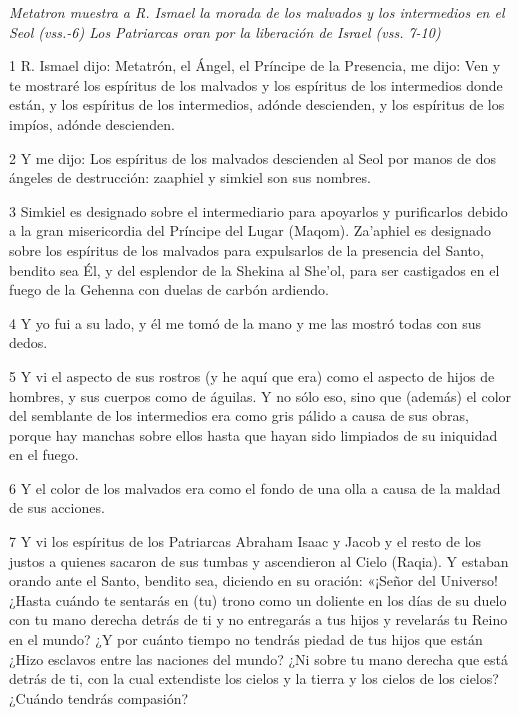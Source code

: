 \par \textit{Metatron muestra a R. Ismael la morada de los malvados y los intermedios en el Seol (vss.-6) Los Patriarcas oran por la liberación de Israel (vss. 7-10)}

\par 1 R. Ismael dijo: Metatrón, el Ángel, el Príncipe de la Presencia, me dijo: Ven y te mostraré los espíritus de los malvados y los espíritus de los intermedios donde están, y los espíritus de los intermedios, adónde descienden, y los espíritus de los impíos, adónde descienden.

\par 2 Y me dijo: Los espíritus de los malvados descienden al Seol por manos de dos ángeles de destrucción: zaaphiel y simkiel son sus nombres.

\par 3 Simkiel es designado sobre el intermediario para apoyarlos y purificarlos debido a la gran misericordia del Príncipe del Lugar (Maqom). Za'aphiel es designado sobre los espíritus de los malvados para expulsarlos de la presencia del Santo, bendito sea Él, y del esplendor de la Shekina al She'ol, para ser castigados en el fuego de la Gehenna con duelas de carbón ardiendo.

\par 4 Y yo fui a su lado, y él me tomó de la mano y me las mostró todas con sus dedos.

\par 5 Y vi el aspecto de sus rostros (y he aquí que era) como el aspecto de hijos de hombres, y sus cuerpos como de águilas. Y no sólo eso, sino que (además) el color del semblante de los intermedios era como gris pálido a causa de sus obras, porque hay manchas sobre ellos hasta que hayan sido limpiados de su iniquidad en el fuego.

\par 6 Y el color de los malvados era como el fondo de una olla a causa de la maldad de sus acciones.

\par 7 Y vi los espíritus de los Patriarcas Abraham Isaac y Jacob y el resto de los justos a quienes sacaron de sus tumbas y ascendieron al Cielo (Raqia). Y estaban orando ante el Santo, bendito sea, diciendo en su oración: «¡Señor del Universo! ¿Hasta cuándo te sentarás en (tu) trono como un doliente en los días de su duelo con tu mano derecha detrás de ti y no entregarás a tus hijos y revelarás tu Reino en el mundo? ¿Y por cuánto tiempo no tendrás piedad de tus hijos que están ¿Hizo esclavos entre las naciones del mundo? ¿Ni sobre tu mano derecha que está detrás de ti, con la cual extendiste los cielos y la tierra y los cielos de los cielos? ¿Cuándo tendrás compasión?

